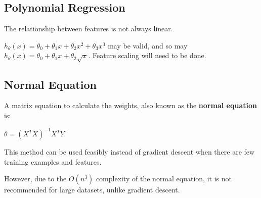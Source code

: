     \subsection{Polynomial Regression}
        The relationship between features is not always linear.

        $h_\theta(x) = \theta_0 + \theta_1 x + \theta_2 x^2 + \theta_3 x^3$ may be valid, and so may $h_\theta(x) = \theta_0 + \theta_1 x + \theta_2 \sqrt{x}$. Feature scaling will need to be done.

    \subsection{Normal Equation}
        A matrix equation to calculate the weights, also known as the \textbf{normal equation} is:

        $\theta = (X^TX)^{-1}X^TY$

        This method can be used feasibly instead of gradient descent when there are few training examples
        and features.

        However, due to the $O(n^3)$ complexity of the normal equation, it is not recommended for large datasets, unlike gradient descent.
